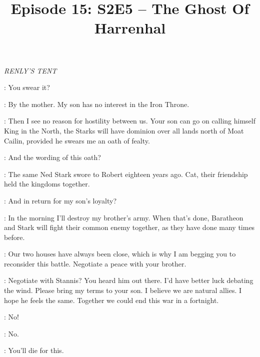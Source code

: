 

\title{Episode 15: S2E5 -- The Ghost Of Harrenhal}
\author{}
\date{}
\maketitle






\scene

\textit{RENLY'S TENT} 


\RENLY: You swear it? 

\CATELYN: By the mother. My son has no interest in the Iron Throne. 

\RENLY: Then I see no reason for hostility between us. Your son can go on calling himself King in the North, the Starks will have dominion over all lands north of Moat Cailin, provided he swears me an oath of fealty. 

\CATELYN: And the wording of this oath? 

\RENLY: The same Ned Stark swore to Robert eighteen years ago. Cat, their friendship held the kingdoms together. 

\CATELYN: And in return for my son's loyalty? 

\RENLY: In the morning I'll destroy my brother's army. When that's done, Baratheon and Stark will fight their common enemy together, as they have done many times before. 

\CATELYN: Our two houses have always been close, which is why I am begging you to reconsider this battle. Negotiate a peace with your brother. 

\RENLY: Negotiate with Stannis? You heard him out there. I'd have better luck debating the wind. Please bring my terms to your son. I believe we are natural allies. I hope he feels the same. Together we could end this war in a fortnight. 


\BRIENNE: No! 


\BRIENNE: No. 



\GUARD:  You'll die for this. 


